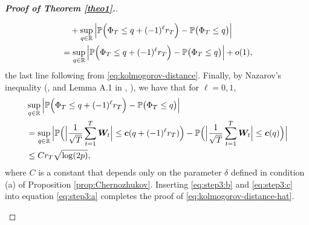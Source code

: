 \documentclass[a4paper,12pt]{article}
\numberwithin{equation}{section}
\begin{document}
\begin{proof}[\textnormal{\textbf{Proof of Theorem \ref{theo1}.}}]
\begin{enumerate}[label=\textit{Step \arabic*.}, leftmargin=0cm, itemindent=1.45cm]
\begin{align}
 & \quad + \sup_{q \in \mathbb{R}} \Big| \mathbb{P} \Big( \Phi_T \le q + (-1)^\ell r_T \Big) - \mathbb{P} \big( \Phi_T \le q \big) \Big| \nonumber \\
 & = \sup_{q \in \mathbb{R}} \Big| \mathbb{P} \Big( \Phi_T \le q + (-1)^\ell r_T \Big) - \mathbb{P} \big( \Phi_T \le q \big) \Big| + o(1), \label{eq:step3:b}
\end{align}
the last line following from \eqref{eq:kolmogorov-distance}. Finally, by Nazarov's inequality {\color{red}(\citeauthor{Nazarov2003}, \citeyear{Nazarov2003} and Lemma A.1 in \citeauthor{Chernozhukov2017}, \citeyear{Chernozhukov2017})}, we have that for $\ell = 0,1$,   
\begin{align} 
 & \sup_{q \in \mathbb{R}} \Big| \mathbb{P} \Big( \Phi_T \le q + (-1)^\ell r_T \Big) - \mathbb{P} \big( \Phi_T \le q \big) \Big| \nonumber \\
 & = \sup_{q \in \mathbb{R}} \Big| \mathbb{P} \Big( \Big|\frac{1}{\sqrt{T}} \sum_{t=1}^T \boldsymbol{W}_t\Big| \le \boldsymbol{c}(q + (-1)^\ell r_T) \Big) - \mathbb{P} \Big( \Big|\frac{1}{\sqrt{T}} \sum_{t=1}^T \boldsymbol{W}_t\Big| \le \boldsymbol{c}(q) \Big) \Big| \nonumber \\
 & \le C r_T \sqrt{\log(2 p)}, \label{eq:step3:c}
\end{align}
where $C$ is a constant that depends only on the parameter $\delta$ defined in condition (a) of Proposition \ref{prop:Chernozhukov}. Inserting \eqref{eq:step3:b} and \eqref{eq:step3:c} into equation \eqref{eq:step3:a} completes the proof of \eqref{eq:kolmogorov-distance-hat}.



\end{enumerate}
\end{proof}
\end{document}
